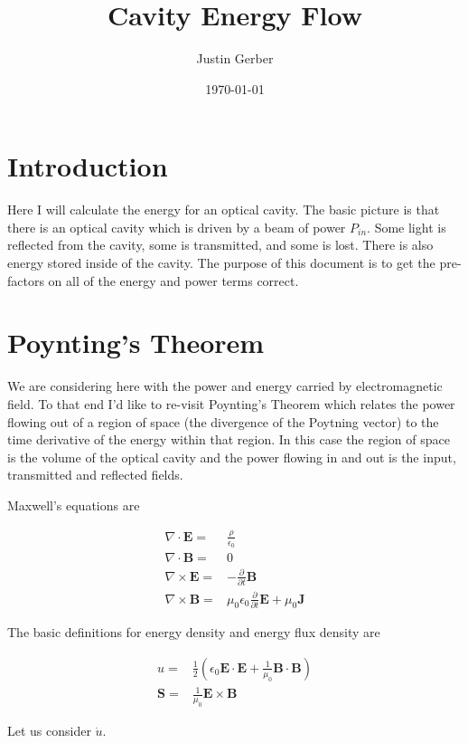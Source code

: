 \documentclass[12pt]{article}
\newcommand{\ep}{\epsilon}
\renewcommand{\vec}[1]{\boldsymbol{#1}}
\begin{document}
\title{Cavity Energy Flow}
\author{Justin Gerber}
\date{\today}
\maketitle

\section{Introduction}
Here I will calculate the energy for an optical cavity. 
The basic picture is that there is an optical cavity which is driven by a beam of power $P_{in}$.
Some light is reflected from the cavity, some is transmitted, and some is lost.
There is also energy stored inside of the cavity.
The purpose of this document is to get the pre-factors on all of the energy and power terms correct.

\section{Poynting's Theorem}

We are considering here with the power and energy carried by electromagnetic field.
To that end I'd like to re-visit Poynting's Theorem which relates the power flowing out of a region of space (the divergence of the Poytning vector) to the time derivative of the energy within that region.
In this case the region of space is the volume of the optical cavity and the power flowing in and out is the input, transmitted and reflected fields.

Maxwell's equations are

\begin{align}
\nabla \cdot \vec{E} =& \frac{\rho}{\ep_0}\\
\nabla \cdot \vec{B} =& 0\\
\nabla \times \vec{E} =& -\frac{\partial}{\partial t}\vec{B}\\
\nabla \times \vec{B} =& \mu_0 \ep_0 \frac{\partial}{\partial t}\vec{E} + \mu_0 \vec{J}
\end{align}

The basic definitions for energy density and energy flux density are

\begin{align}
u =& \frac{1}{2}\left(\ep_0 \vec{E}\cdot\vec{E} + \frac{1}{\mu_0}\vec{B}\cdot\vec{B}\right)\\
\vec{S} =& \frac{1}{\mu_0}\vec{E}\times \vec{B}
\end{align}

Let us consider $\dot{u}$.
\end{document}
